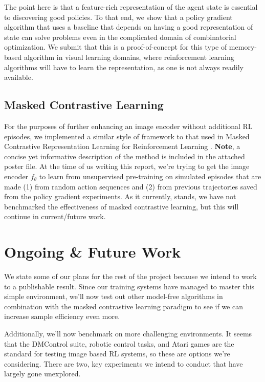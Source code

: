 \documentclass[11pt]{article}
\begin{document}
The point here is that a feature-rich representation of the agent state is essential to discovering good policies. To that end, we show that a policy gradient algorithm that uses a baseline that depends on having a good representation of state can solve problems even in the complicated domain of combinatorial optimization. We submit that this is a proof-of-concept for this type of memory-based algorithm in visual learning domains, where reinforcement learning algorithms will have to learn the representation, as one is not always readily available.  

\subsection{Masked Contrastive Learning}

For the purposes of further enhancing an image encoder without additional RL episodes, we implemented a similar style of framework to that used in Masked Contrastive Representation Learning for Reinforcement Learning \cite{zhu2020masked}. \textbf{Note}, a concise yet informative description of the method is included in the attached poster file. At the time of us writing this report, we're  trying to get the image encoder $f_\theta$ to learn from unsupervised pre-training on simulated episodes that are made (1) from random action sequences and (2) from previous trajectories saved from the policy gradient experiments. As it currently, stands, we have not benchmarked the effectiveness of masked contrastive learning, but this will continue in current/future work. 

\section{Ongoing \& Future Work}

We state some of our plans for the rest of the project because we intend to work to a publishable result. Since our training systems have managed to master this simple environment, we'll now test out other model-free algorithms in combination with the masked contrastive learning paradigm to see if we can increase sample efficiency even more. 

Additionally, we'll now benchmark on more challenging environments. It seems that the DMControl suite, robotic control tasks, and Atari games are the standard for testing image based RL systems, so these are options we're considering. There are two, key experiments we intend to conduct that have largely gone unexplored.
\end{document}

